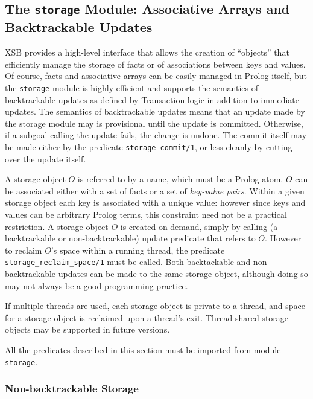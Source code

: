 
\subsection{The {\tt storage} Module: Associative Arrays and Backtrackable Updates}
\label{storage module}

XSB provides a high-level interface that allows the creation of
``objects'' that efficiently manage the storage of facts or of
associations between keys and values.  Of course, facts and
associative arrays can be easily managed in Prolog itself, but the
{\tt storage} module is highly efficient and supports the semantics of
backtrackable updates as defined by Transaction logic \cite{BoKi94} in
addition to immediate updates.  The semantics of backtrackable updates
means that an update made by the storage module may is provisional
until the update is committed.  Otherwise, if a subgoal calling the
update fails, the change is undone. The commit itself may be made
either by the predicate {\tt storage\_commit/1}, or less cleanly by
cutting over the update itself.

A storage object $O$ is referred to by a name, which must be a Prolog
atom.  $O$ can be associated either with a set of facts or a set of
\emph{key-value pairs}.  Within a given storage object each key is
associated with a unique value: however since keys and values can be
arbitrary Prolog terms, this constraint need not be a practical
restriction.  A storage object $O$ is created on demand, simply by
calling (a backtrackable or non-backtrackable) update predicate that
refers to $O$.  However to reclaim $O$'s space within a running
thread, the predicate {\tt storage\_reclaim\_space/1} must be called.
Both backtackable and non-backtrackable updates can be made to the
same storage object, although doing so may not always be a good
programming practice.

If multiple threads are used, each storage object is private to a
thread, and space for a storage object is reclaimed upon a thread's
exit.  Thread-shared storage objects may be supported in future
versions.

All the predicates described in this section must be imported from
module {\tt storage}.

\subsubsection{Non-backtrackable Storage}

